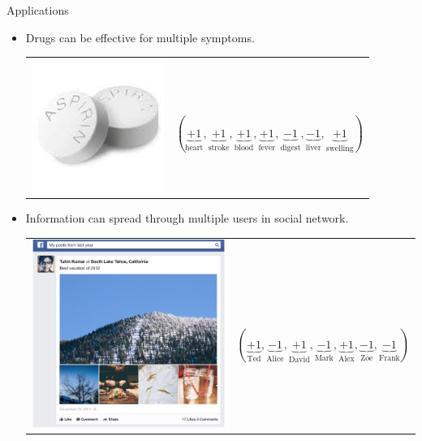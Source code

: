 \documentclass[first=purple,second=dgreen,logo=redexc]{aaltoslides}
\begin{document}
{\begin{frame}{Applications}
\begin{itemize}
\begin{tabular}{p{3cm}p{10cm}}
        \end{tabular}
		\item Drugs can be effective for multiple symptoms.
		\begin{tabular}{p{3cm}p{10cm}} 
        \multirow{2}{*}{\includegraphics[scale = 0.3]{./figures/aspirin.jpg}} & \\
		& $(\underbrace{+1}_{\text{heart}},\underbrace{+1}_{\text{stroke}},\underbrace{+1}_{\text{blood}},\underbrace{+1}_{\text{fever}},\underbrace{-1}_{\text{digest}},\underbrace{-1}_{\text{liver}},\underbrace{+1}_{\text{swelling}})$\\
        \end{tabular}
		\item Information can spread through multiple users in social network. 
		\begin{tabular}{p{3cm}p{10cm}} 
        \multirow{2}{*}{\includegraphics[scale = 0.07]{./figures/facebookvideo.png}} & \\
		& $(\underbrace{+1}_{\text{Ted}},\underbrace{-1}_{\text{Alice}},\underbrace{+1}_{\text{David}},\underbrace{-1}_{\text{Mark}},\underbrace{+1}_{\text{Alex}},\underbrace{-1}_{\text{Zoe}},\underbrace{-1}_{\text{Frank}})$\\
        \end{tabular}
	\end{itemize}
\end{frame}


}
\end{document}
